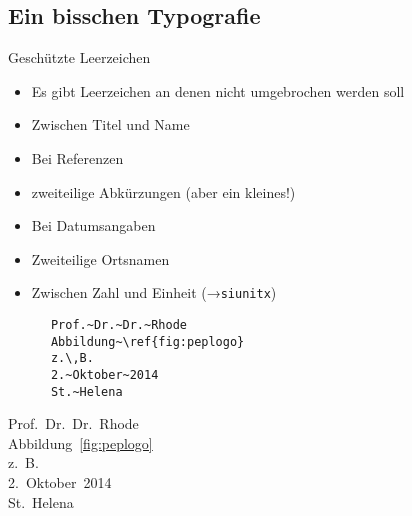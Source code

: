 \subsection{Ein bisschen Typografie}
\begin{frame}[fragile]{Geschützte Leerzeichen}
  \begin{itemize}
    \item Es gibt Leerzeichen an denen nicht umgebrochen werden soll
    \item Zwischen Titel und Name
    \item Bei Referenzen
    \item zweiteilige Abkürzungen (aber ein kleines!)
    \item Bei Datumsangaben
    \item Zweiteilige Ortsnamen
    \item Zwischen Zahl und Einheit (→\texttt{siunitx})
  \end{itemize}
  \begin{CodeExample}{0.5}
    \begin{lstlisting}
      Prof.~Dr.~Dr.~Rhode
      Abbildung~\ref{fig:peplogo}
      z.\,B.
      2.~Oktober~2014
      St.~Helena 
    \end{lstlisting}
    \CodeResult
      Prof.~Dr.~Dr.~Rhode \\
      Abbildung~\ref{fig:peplogo} \\
      z.~B. \\
      2.~Oktober~2014 \\
      St.~Helena
  \end{CodeExample}
\end{frame}

